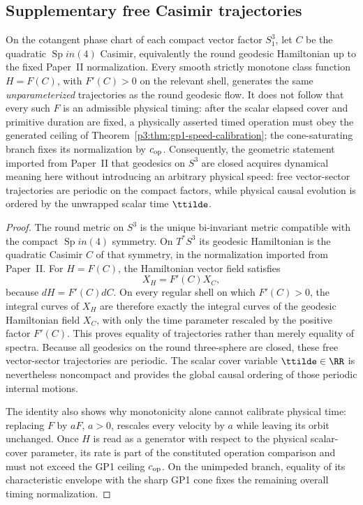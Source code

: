 \documentclass[11pt,a4paper]{article}
\begin{document}
\subsection{Supplementary free Casimir trajectories}

\begin{proposition}
\label{p3:prop:free-casimir-flow}
On the cotangent phase chart of each compact vector factor $S^3_1$, let
\(C\) be the quadratic \(\operatorname{Sp}in(4)\) Casimir, equivalently the round geodesic
Hamiltonian up to the fixed Paper~II normalization.  Every smooth strictly
monotone class function \(H=F(C)\), with \(F'(C)>0\) on the relevant shell,
generates the same \emph{unparameterized} trajectories as the round geodesic
flow.  It does not follow that every such \(F\) is an admissible physical
timing: after the scalar elapsed cover and primitive duration are fixed, a
physically asserted timed operation must obey the generated ceiling of
Theorem~\ref{p3:thm:gp1-speed-calibration}; the cone-saturating
branch fixes its normalization by \(c_{\rm op}\).  Consequently, the geometric
statement imported from Paper~II that geodesics on \(S^3\) are closed
acquires dynamical meaning here without introducing an arbitrary physical
speed: free vector-sector trajectories are periodic on the compact factors,
while physical causal evolution is ordered by the unwrapped scalar time
\(\ttilde\).
\end{proposition}

\begin{proof}
The round metric on $S^3$ is the unique bi-invariant metric compatible with
the compact $\operatorname{Sp}in(4)$ symmetry.  On $T^*S^3$ its geodesic Hamiltonian is the
quadratic Casimir $C$ of that symmetry, in the normalization imported from
Paper~II.  For $H=F(C)$, the Hamiltonian vector field satisfies
\[
        X_H=F'(C)X_C,
\]
because $dH=F'(C)dC$.  On every regular shell on which $F'(C)>0$, the integral
curves of $X_H$ are therefore exactly the integral curves of the geodesic
Hamiltonian field $X_C$, with only the time parameter rescaled by the positive
factor $F'(C)$.  This proves equality of trajectories rather than merely
equality of spectra.  Because all geodesics on the round three-sphere are
closed, these free vector-sector trajectories are periodic.  The scalar cover
variable $\ttilde\in\RR$ is nevertheless noncompact and provides the global
causal ordering of those periodic internal motions.

The identity also shows why monotonicity alone cannot calibrate physical
time: replacing \(F\) by \(aF\), \(a>0\), rescales every velocity by \(a\)
while leaving its orbit unchanged.  Once \(H\) is read as a generator with
respect to the physical scalar-cover parameter, its rate is part of the
constituted operation comparison and must not exceed the GP1 ceiling
\(c_{\rm op}\).  On the unimpeded branch, equality of its characteristic
envelope with the sharp GP1 cone fixes the remaining overall timing
normalization.
\end{proof}
\end{document}
